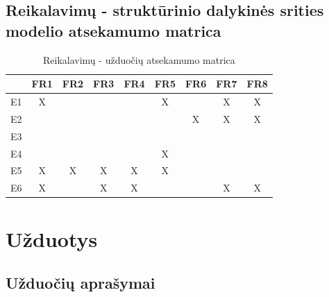 \documentclass{VUMIFPSkursinis}
\begin{document}
            \subsection{Reikalavimų - struktūrinio dalykinės srities modelio atsekamumo matrica}
            \begin{table}[H]\footnotesize
                \centering
                \caption{Reikalavimų - užduočių atsekamumo matrica}
                {
                    \begin{tabular}{|c|c|c|c|c|c|c|c|c| }
                    \hline
                        & FR1 & FR2 & FR3 & FR4 & FR5 & FR6 & FR7 & FR8 \\ 
                    \hline
                        E1 & X   &     &     &     & X   &     & X   & X    \\  
                    \hline
                        E2 &     &     &     &     &     & X   & X   & X    \\ 
                    \hline
                        E3 &     &     &     &     &     &     &     &      \\ 
                    \hline
                        E4 &     &     &     &     & X   &     &     &      \\ 
                    \hline
                        E5 & X   & X   & X   & X   & X   &     &     &      \\ 
                    \hline
                        E6 & X   &     & X   & X   &     &     & X   & X    \\ 
                    \hline 
                    \end{tabular}
                }
                \label{tab:table example}
            \end{table}
      
        \section{Užduotys}
            \subsection{Užduočių aprašymai}
            
\end{document}
